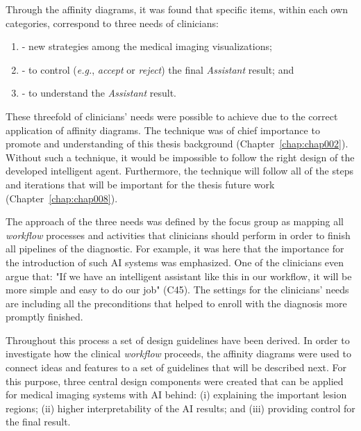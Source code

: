 \hfill

\noindent
Through the affinity diagrams, it was found that specific items, within each own categories, correspond to three needs of clinicians:

\begin{enumerate}[label=\alph*]
\item - new strategies among the medical imaging visualizations;
\item - to control ({\it e.g.}, {\it accept} or {\it reject}) the final {\it Assistant} result; and
\item - to understand the {\it Assistant} result.
\end{enumerate}

These threefold of clinicians' needs were possible to achieve due to the correct application of affinity diagrams.
The technique was of chief importance to promote and understanding of this thesis background (Chapter~\ref{chap:chap002}).
Without such a technique, it would be impossible to follow the right design of the developed intelligent agent.
Furthermore, the technique will follow all of the steps and iterations that will be important for the thesis future work (Chapter~\ref{chap:chap008}).

The approach of the three needs was defined by the focus group as mapping all {\it workflow} processes and activities that clinicians should perform in order to finish all pipelines of the diagnostic.
For example, it was here that the importance for the introduction of such \ac{AI} systems was emphasized.
One of the clinicians even argue that: "If we have an intelligent assistant like this in our workflow, it will be more simple and easy to do our job" (C45).
The settings for the clinicians' needs are including all the preconditions that helped to enroll with the diagnosis more promptly finished.

Throughout this process a set of design guidelines have been derived.
In order to investigate how the clinical {\it workflow} proceeds, the affinity diagrams were used to connect ideas and features to a set of guidelines that will be described next.
For this purpose, three central design components were created that can be applied for medical imaging systems with \ac{AI} behind: (i) explaining the important lesion regions; (ii) higher interpretability of the \ac{AI} results; and (iii) providing control for the final result.

\hfill


